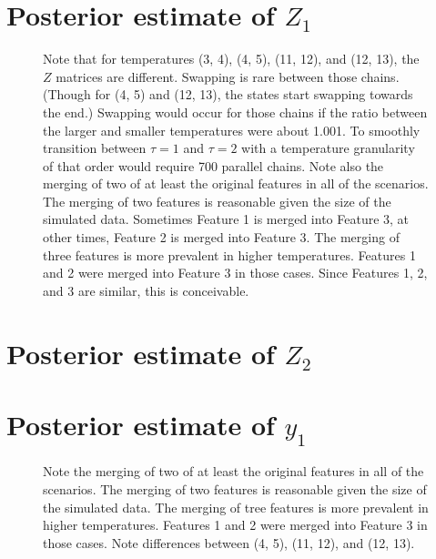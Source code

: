 \documentclass[10pt]{article} %
\begin{document}
\newpage
\section{Posterior estimate of $Z_1$}
\begin{figure}[H]
  \begin{center}  %
  \end{center}
  \caption{Note that for temperatures (3, 4), (4, 5), (11, 12), and (12, 13),
  the $Z$ matrices are different. Swapping is rare between those chains.
  (Though for (4, 5) and (12, 13), the states start swapping towards the end.)
  Swapping would occur for those chains if the ratio between the larger and smaller
  temperatures were about 1.001. To smoothly transition between $\tau=1$ and
  $\tau=2$ with a temperature granularity of that order would require 700 parallel
  chains. Note also the merging of two of at least the original features in all of
  the scenarios. The merging of two features is reasonable given the size of
  the simulated data. Sometimes Feature 1 is merged into Feature 3, at other times,
  Feature 2 is merged into Feature 3. The merging of three features is more
  prevalent in higher temperatures. Features 1 and 2 were merged into Feature 3
  in those cases. Since Features 1, 2, and 3 are similar, this is conceivable.}
  \label{fig:z1est}
\end{figure}

\newpage
\section{Posterior estimate of $Z_2$}
\begin{figure}[H]
  \begin{center}  %
  \end{center}
  \label{fig:z2est}
\end{figure}

\newpage
\section{Posterior estimate of $y_1$}
\begin{figure}[H]
  \begin{center}  %
  \end{center}
  \label{fig:y1est}
  \caption{Note the merging of two of at least the original features in all of
  the scenarios. The merging of two features is reasonable given the size of
  the simulated data. The merging of tree features is more prevalent in higher
  temperatures. Features 1 and 2 were merged into Feature 3 in those
  cases. Note differences between (4, 5), (11, 12), and (12, 13).}
\end{figure}
\end{document}
